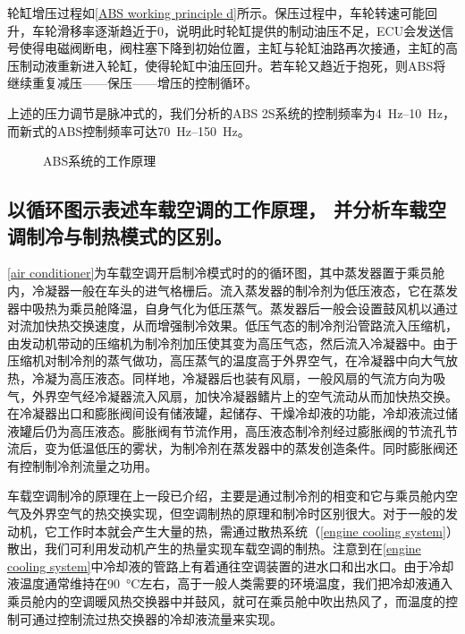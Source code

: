\documentclass[UTF8]{ctexart}
\numberwithin{figure}{section}
\numberwithin{table}{section}
\begin{document}
轮缸增压过程如\cref{ABS working principle d}所示。保压过程中，车轮转速可能回升，车轮滑移率逐渐趋近于0，说明此时轮缸提供的制动油压不足，ECU会发送信号使得电磁阀断电，阀柱塞下降到初始位置，主缸与轮缸油路再次接通，主缸的高压制动液重新进入轮缸，使得轮缸中油压回升。若车轮又趋近于抱死，则ABS将继续重复减压——保压——增压的控制循环。

上述的压力调节是脉冲式的，我们分析的ABS 2S系统的控制频率为\qtyrange[range-phrase = $\,\sim\,$, range-units = single]{4}{10}{\Hz}，而新式的ABS控制频率可达\qtyrange[range-phrase = $\,\sim\,$, range-units = single]{70}{150}{\Hz}。

\begin{figure}[htbp]
	\centering
	\caption{ABS系统的工作原理}
	\label{ABS working principle}
\end{figure}

\subsection{以循环图示表述车载空调的工作原理， 并分析车载空调制冷与制热模式的区别。}

\cref{air conditioner}为车载空调开启制冷模式时的的循环图，其中蒸发器置于乘员舱内，冷凝器一般在车头的进气格栅后。流入蒸发器的制冷剂为低压液态，它在蒸发器中吸热为乘员舱降温，自身气化为低压蒸气。蒸发器后一般会设置鼓风机以通过对流加快热交换速度，从而增强制冷效果。低压气态的制冷剂沿管路流入压缩机，由发动机带动的压缩机为制冷剂加压使其变为高压气态，然后流入冷凝器中。由于压缩机对制冷剂的蒸气做功，高压蒸气的温度高于外界空气，在冷凝器中向大气放热，冷凝为高压液态。同样地，冷凝器后也装有风扇，一般风扇的气流方向为吸气，外界空气经冷凝器流入风扇，加快冷凝器鳍片上的空气流动从而加快热交换。在冷凝器出口和膨胀阀间设有储液罐，起储存、干燥冷却液的功能，冷却液流过储液罐后仍为高压液态。膨胀阀有节流作用，高压液态制冷剂经过膨胀阀的节流孔节流后，变为低温低压的雾状，为制冷剂在蒸发器中的蒸发创造条件。同时膨胀阀还有控制制冷剂流量之功用。

车载空调制冷的原理在上一段已介绍，主要是通过制冷剂的相变和它与乘员舱内空气及外界空气的热交换实现，但空调制热的原理和制冷时区别很大。对于一般的发动机，它工作时本就会产生大量的热，需通过散热系统（\cref{engine cooling system}）散出，我们可利用发动机产生的热量实现车载空调的制热。注意到在\cref{engine cooling system}中冷却液的管路上有着通往空调装置的进水口和出水口。由于冷却液温度通常维持在\SI{90}{\celsius}左右，高于一般人类需要的环境温度，我们把冷却液通入乘员舱内的空调暖风热交换器中并鼓风，就可在乘员舱中吹出热风了，而温度的控制可通过控制流过热交换器的冷却液流量来实现。
\end{document}
